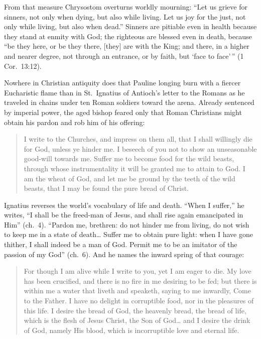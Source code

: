 From that measure Chrysostom overturns worldly mourning: ``Let us grieve for sinners, not only when dying, but also while living. Let us joy for the just, not only while living, but also when dead.'' Sinners are pitiable even in health because they stand at enmity with God; the righteous are blessed even in death, because ``be they here, or be they there, [they] are with the King; and there, in a higher and nearer degree, not through an entrance, or by faith, but `face to face'\,'' (1 Cor.\ 13:12).

Nowhere in Christian antiquity does that Pauline longing burn with a fiercer Eucharistic flame than in St.\ Ignatius of Antioch's letter to the Romans as he traveled in chains under ten Roman soldiers toward the arena. Already sentenced by imperial power, the aged bishop feared only that Roman Christians might obtain his pardon and rob him of his offering:

\begin{quote}
I write to the Churches, and impress on them all, that I shall willingly die for God, unless ye hinder me. I beseech of you not to show an unseasonable good-will towards me. Suffer me to become food for the wild beasts, through whose instrumentality it will be granted me to attain to God. I am the wheat of God, and let me be ground by the teeth of the wild beasts, that I may be found the pure bread of Christ.
\end{quote}

Ignatius reverses the world's vocabulary of life and death. ``When I suffer,'' he writes, ``I shall be the freed-man of Jesus, and shall rise again emancipated in Him'' (ch.\ 4). ``Pardon me, brethren: do not hinder me from living, do not wish to keep me in a state of death\ldots{} Suffer me to obtain pure light: when I have gone thither, I shall indeed be a man of God. Permit me to be an imitator of the passion of my God'' (ch.\ 6). And he names the inward spring of that courage:

\begin{quote}
For though I am alive while I write to you, yet I am eager to die. My love has been crucified, and there is no fire in me desiring to be fed; but there is within me a water that liveth and speaketh, saying to me inwardly, Come to the Father. I have no delight in corruptible food, nor in the pleasures of this life. I desire the bread of God, the heavenly bread, the bread of life, which is the flesh of Jesus Christ, the Son of God\ldots{} and I desire the drink of God, namely His blood, which is incorruptible love and eternal life.
\end{quote}

